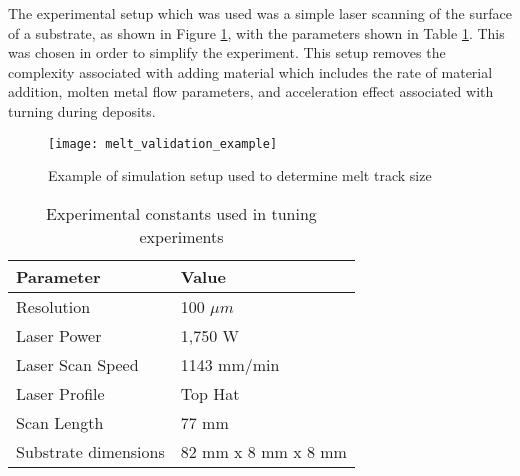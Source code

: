 The experimental setup which was used was a simple laser scanning of the surface of a substrate, as shown in Figure \ref{fig:melt_validation_example}, with the parameters shown in Table \ref{tab:exp_constants}.  This was chosen in order to simplify the experiment.  This setup removes the complexity associated with adding material which includes the rate of material addition, molten metal flow parameters, and acceleration effect associated with turning during deposits.
\begin{figure}[!htb]
	\centering
	\texttt{[image: melt\_validation\_example]}
	\caption{Example of simulation setup used to determine melt track size}
	\label{fig:melt_validation_example}
\end{figure}
\begin{table}[!htb]
	\centering
	\caption{Experimental constants used in tuning experiments}
	\label{tab:exp_constants}
	\begin{tabular}{|l|l|} \hline
		Parameter & Value \\ \hline
		Resolution & 100 $\mu m$ \\ \hline
		Laser Power & 1,750 W \\ \hline
		Laser Scan Speed & 1143 mm/min \\ \hline
		Laser Profile & Top Hat \\ \hline
		Scan Length & 77 mm \\ \hline
		Substrate dimensions & 82 mm x 8 mm x 8 mm \\ \hline
	\end{tabular}
\end{table}



